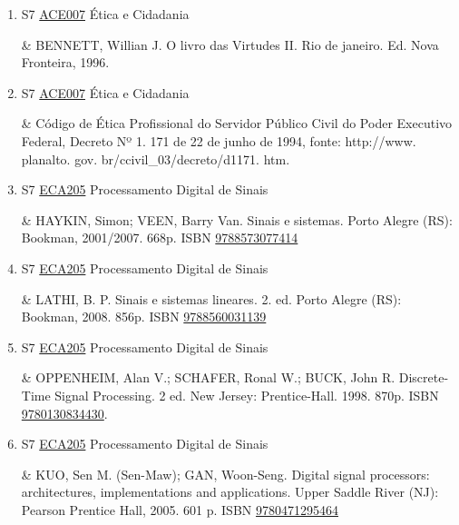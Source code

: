 \documentclass[12pt,a4paper]{book}
\begin{document}
\begin{enumerate}
&   SINGER, Peter.  Ética Prática.  São Paulo: Martins Fontes, 1994.  ISBN \href{http://www.bn.br/site/pages/servicosProfissionais/agenciaISBN/isbnBusca/FbnBuscaISBNCatalogo.asp?pField=ISBN&pIntPagina=1&pISBN=33616684&nidbISBN=true&hidbISBN=true}{9788533616684}
 

 \item S7 \hyperref[PUD:ACE007]{ACE007} Ética e Cidadania

&    BENNETT, Willian J.  O livro das Virtudes II.  Rio de janeiro.  Ed.  Nova Fronteira, 1996. 
 

 \item S7 \hyperref[PUD:ACE007]{ACE007} Ética e Cidadania

&   Código de Ética Profissional do Servidor Público Civil do Poder Executivo Federal, Decreto Nº 1. 171 de 22 de junho de 1994, fonte: http://www. planalto. gov. br/ccivil_03/decreto/d1171. htm.
 \item S7 \hyperref[PUD:ECA205]{ECA205} Processamento Digital de Sinais

&  HAYKIN, Simon;  VEEN, Barry Van.  Sinais e sistemas.  Porto Alegre (RS): Bookman, 2001/2007.  668p.   ISBN \href{http://www.bn.br/site/pages/servicosProfissionais/agenciaISBN/isbnBusca/FbnBuscaISBNCatalogo.asp?pField=ISBN&pIntPagina=1&pISBN=73077414&nidbISBN=true&hidbISBN=true}{9788573077414}
 

 \item S7 \hyperref[PUD:ECA205]{ECA205} Processamento Digital de Sinais

&  LATHI, B.  P.  Sinais e sistemas lineares.  2. ed.  Porto Alegre (RS): Bookman, 2008.  856p.    ISBN \href{http://www.bn.br/site/pages/servicosProfissionais/agenciaISBN/isbnBusca/FbnBuscaISBNCatalogo.asp?pField=ISBN&pIntPagina=1&pISBN=60031139&nidbISBN=true&hidbISBN=true}{9788560031139}
 

 \item S7 \hyperref[PUD:ECA205]{ECA205} Processamento Digital de Sinais

& OPPENHEIM, Alan V.;  SCHAFER, Ronal W.;  BUCK, John R.  Discrete-Time Signal Processing.  2 ed.  New Jersey: Prentice-Hall.  1998.  870p.  ISBN \href{http://www.isbnsearch.org/isbn/9780130834430}{9780130834430}.
 \item S7 \hyperref[PUD:ECA205]{ECA205} Processamento Digital de Sinais

&  KUO, Sen M.  (Sen-Maw);  GAN, Woon-Seng.  Digital signal processors: architectures, implementations and applications.  Upper Saddle River (NJ): Pearson Prentice Hall, 2005.  601 p.   ISBN \href{http://www.isbnsearch.org/isbn/9780471295464}{9780471295464}
 


\end{enumerate}
\end{document}
